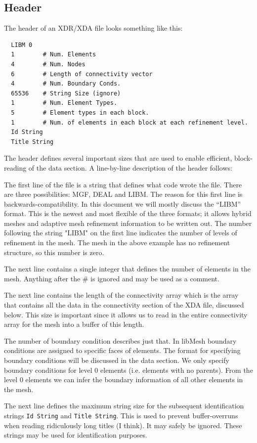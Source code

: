 \documentclass[12pt]{article}
\begin{document}
\subsection{Header}
The header of an XDR/XDA file looks something like this:
\small
\begin{verbatim}
  LIBM 0
  1        # Num. Elements
  4        # Num. Nodes
  6        # Length of connectivity vector
  4        # Num. Boundary Conds.
  65536    # String Size (ignore)
  1        # Num. Element Types.
  5        # Element types in each block.
  1        # Num. of elements in each block at each refinement level.
  Id String
  Title String
\end{verbatim}
\normalsize
The header defines several important sizes that are used to enable efficient, block-reading of the data section. A line-by-line description of the header follows:

The first line of the file is a string that defines what code wrote the file. There are three possibilities: MGF, DEAL and LIBM. The reason for this first line is backwards-compatibility. In this document we will mostly discuss the ``LIBM'' format. This is the newest and most flexible of the three formats; it allows hybrid meshes and adaptive mesh refinement information to be written out. The number following the string "LIBM" on the first line indicates the number of levels of refinement in the mesh. The mesh in the above example has no refinement structure, so this number is zero.

The next line contains a single integer that defines the number of elements in the mesh.  Anything after the \# is ignored and may be used as a comment.

The next line contains the length of the connectivity array which is the array that contains all the data in the connectivity section of the XDA file, discussed below. This size is important since it allows us to read in the entire connectivity array for the mesh into a buffer of this length.

The number of boundary condition describes just that.  In libMesh boundary conditions are assigned to specific faces of elements.  The format for specifying boundary conditions will be discussed in the data section. We only specify boundary conditions for level 0 elements (i.e. elements with no parents). From the level 0 elements we can infer the boundary information of all other elements in the mesh.

The next line defines the maximum string size for the subsequent identification strings \texttt{Id~String} and \texttt{Title~String}. This is used to prevent buffer-overruns when reading ridiculously long titles (I think).  It may safely be ignored.  These strings may be used for identification purposes.
\end{document}
